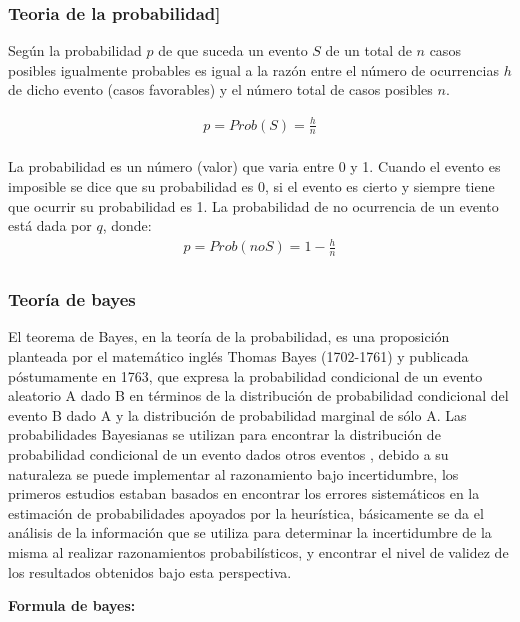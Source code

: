 \subsubsection{Teoria de la probabilidad]}

Según \citep{alvarez_rojas} la probabilidad \(p\) de que suceda un evento \(S\) de un total de \(n\) casos posibles igualmente probables es igual a la razón entre el número de ocurrencias \(h\) de dicho evento (casos favorables) y el número total de casos posibles \(n\).

\begin{align*}
p = Prob(S) = \frac{h}{n}\\
\end{align*}

La probabilidad es un número (valor) que varia entre 0 y 1. Cuando el evento es imposible se dice que su probabilidad es 0, si el evento es cierto y siempre tiene que ocurrir su probabilidad es 1.
La probabilidad de no ocurrencia de un evento está dada por \(q\), donde:
\begin{align*}
p = Prob(noS) = 1 - \frac{h}{n}\\
\end{align*}


\subsubsection{Teoría de bayes}

El teorema de Bayes, en la teoría de la probabilidad, es una proposición planteada por el matemático inglés Thomas Bayes (1702-1761) \citep{bayes} y publicada póstumamente en 1763, que expresa la probabilidad condicional de un evento aleatorio A dado B en términos de la distribución de probabilidad condicional del evento B dado A y la distribución de probabilidad marginal de sólo A.
\vskip 0.1cm 
Las probabilidades Bayesianas se utilizan para encontrar la distribución de probabilidad condicional de un evento dados otros eventos , debido a su naturaleza se puede implementar al razonamiento bajo incertidumbre, los primeros estudios estaban basados en encontrar los errores sistemáticos en la estimación de probabilidades apoyados por la heurística, básicamente se da el análisis de la información que se utiliza para determinar la incertidumbre de la misma al realizar razonamientos probabilísticos, y encontrar el nivel de validez de los resultados obtenidos bajo esta perspectiva.

{\bf Formula de bayes:}\par

